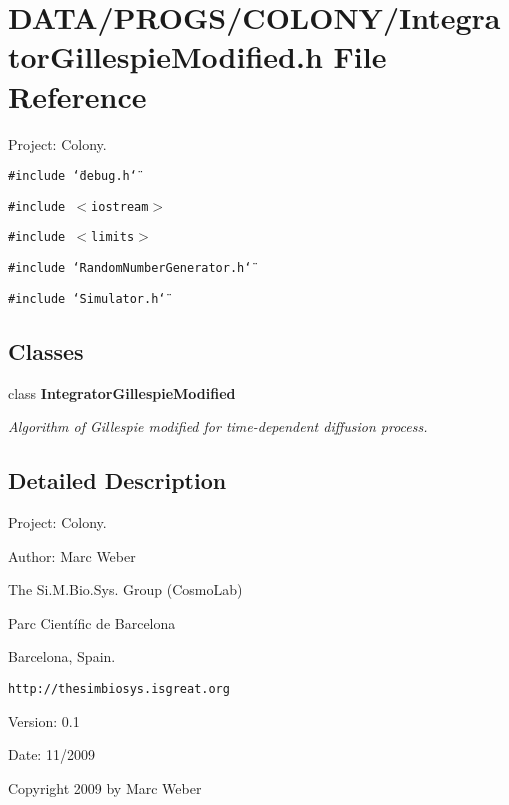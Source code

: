 \section{DATA/PROGS/COLONY/IntegratorGillespieModified.h File Reference}
\label{IntegratorGillespieModified_8h}
Project: Colony. 

{\tt \#include \char`\"{}debug.h\char`\"{}}\par
{\tt \#include $<$iostream$>$}\par
{\tt \#include $<$limits$>$}\par
{\tt \#include \char`\"{}RandomNumberGenerator.h\char`\"{}}\par
{\tt \#include \char`\"{}Simulator.h\char`\"{}}\par
\subsection*{Classes}
\begin{CompactItemize}
\item 
class {\bf IntegratorGillespieModified}
\begin{CompactList}\small\item\em Algorithm of Gillespie modified for time-dependent diffusion process. \item\end{CompactList}\end{CompactItemize}


\subsection{Detailed Description}
Project: Colony. 

\begin{Desc}
\item[Author:]Marc Weber\par
 The Si.M.Bio.Sys. Group (CosmoLab)\par
 Parc Científic de Barcelona\par
 Barcelona, Spain.\par
 {\tt http://thesimbiosys.isgreat.org} \end{Desc}
\begin{Desc}
\item[Version:]0.1 \end{Desc}
\begin{Desc}
\item[Date:]11/2009\end{Desc}
Copyright 2009 by Marc Weber 